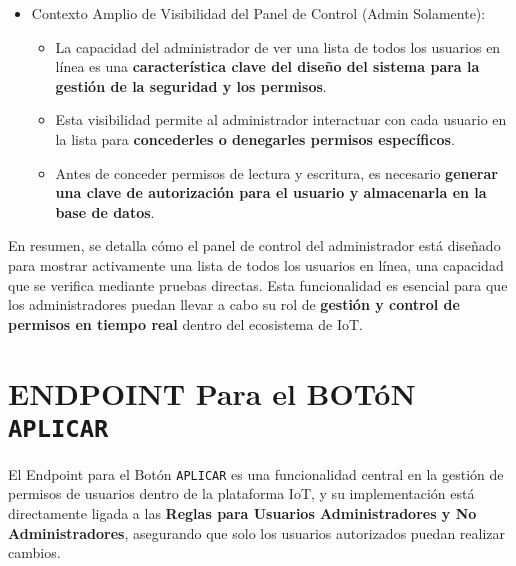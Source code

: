 \documentclass{report}
\begin{document}
\begin{itemize}
    \item Contexto Amplio de Visibilidad del Panel de Control (Admin Solamente):
    \begin{itemize}
        \item La capacidad del administrador de ver una lista de todos los usuarios en línea es una \textbf{característica clave del diseño del sistema para 
              la gestión de la seguridad y los permisos}.
        \item Esta visibilidad permite al administrador interactuar con cada usuario en la lista para \textbf{concederles o denegarles permisos específicos}.
        \item Antes de conceder permisos de lectura y escritura, es necesario \textbf{generar una clave de autorización para el usuario y almacenarla en la 
              base de datos}.
    \end{itemize}
\end{itemize}

En resumen, se  detalla cómo el panel de control del administrador está diseñado para mostrar activamente una lista de todos los 
usuarios en línea, una capacidad que se verifica mediante pruebas directas. Esta funcionalidad es esencial para que los administradores 
puedan llevar a cabo su rol de \textbf{gestión y control de permisos en tiempo real} dentro del ecosistema de IoT.

\section{ENDPOINT Para el BOTóN \texttt{APLICAR}}
El Endpoint para el Botón \texttt{APLICAR} es una funcionalidad central en la gestión de permisos de usuarios dentro de la plataforma IoT, y su 
implementación está directamente ligada a las \textbf{Reglas para Usuarios Administradores y No Administradores}, asegurando que solo los usuarios autorizados 
puedan realizar cambios.
\end{document}
